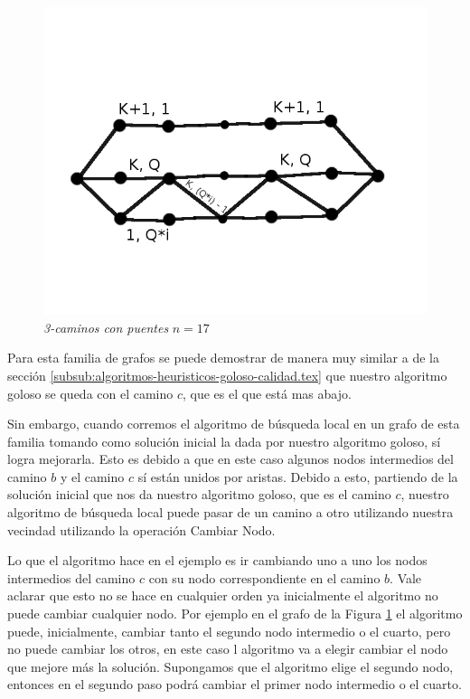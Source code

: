 \begin{figure}[H]
  \begin{center}
    \begin{minipage}{0.5\linewidth}
      \includegraphics[width=\linewidth]{graficos/grafoFamiliaRompe2.png}
      \caption{\emph{3-caminos con puentes} $n=17$}\label{fig:familia-rompe2}
    \end{minipage}
  \end{center}
\end{figure}

Para esta familia de grafos se puede demostrar de manera muy similar a de la sección \ref{subsub:algoritmos-heuristicos-goloso-calidad.tex} que nuestro algoritmo goloso se queda con el camino $c$, que es el que está mas abajo.

Sin embargo, cuando corremos el algoritmo de búsqueda local en un grafo de esta familia tomando como solución inicial la dada por nuestro algoritmo goloso, sí logra mejorarla. Esto es debido a que en este caso algunos nodos intermedios del camino $b$ y el camino $c$ sí están unidos por aristas. Debido a esto, partiendo de la solución inicial que nos da nuestro algoritmo goloso, que es el camino $c$, nuestro algoritmo de búsqueda local puede pasar de un camino a otro utilizando nuestra vecindad utilizando la operación Cambiar Nodo.

Lo que el algoritmo hace en el ejemplo es ir cambiando uno a uno los nodos intermedios del camino $c$ con su nodo correspondiente en el camino $b$. Vale aclarar que esto no se hace en cualquier orden ya inicialmente el algoritmo no puede cambiar cualquier nodo. Por ejemplo en el grafo de la Figura \ref{fig:familia-rompe2} el algoritmo puede, inicialmente, cambiar tanto el segundo nodo intermedio o el cuarto, pero no puede cambiar los otros, en este caso l algoritmo va a elegir cambiar el nodo que mejore más la solución. Supongamos que el algoritmo elige el segundo nodo, entonces en el segundo paso podrá cambiar el primer nodo intermedio o el cuarto.

